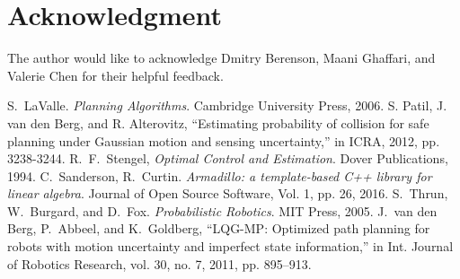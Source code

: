 \documentclass[journal]{IEEEtran}
\begin{document}
\section*{Acknowledgment}
The author would like to acknowledge Dmitry Berenson, Maani Ghaffari, and Valerie Chen for their helpful feedback.

\ifCLASSOPTIONcaptionsoff
  \newpage
\fi





%
%
%
\begin{thebibliography}{1}


 S.~LaValle. \emph{Planning Algorithms}. Cambridge University Press, 2006.
 S. Patil, J. van den Berg, and R. Alterovitz, “Estimating probability of collision for safe planning under Gaussian motion and sensing uncertainty,” in ICRA, 2012, pp. 3238-3244.
 R.~F.~Stengel, \emph{Optimal Control and Estimation}. Dover Publications, 1994.
 C.~Sanderson, R.~Curtin. \emph{Armadillo: a template-based C++ library for linear algebra}. Journal of Open Source Software, Vol. 1, pp. 26, 2016.
 S.~Thrun, W.~Burgard, and D.~Fox. \emph{Probabilistic Robotics}. MIT Press, 2005.
J.~van den Berg, P.~Abbeel, and K.~Goldberg, “LQG-MP: Optimized path planning for robots with motion uncertainty and imperfect state information,” in Int. Journal of Robotics Research, vol. 30, no. 7, 2011, pp. 895–913.

\end{thebibliography}
\end{document}
